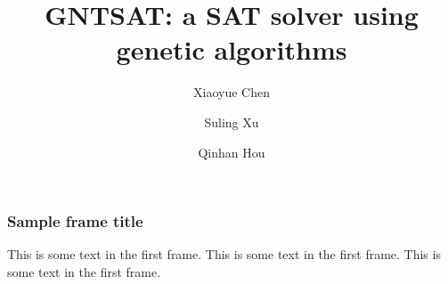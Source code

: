 \documentclass{beamer}
\title[GNTSAT]{GNTSAT: a SAT solver using genetic algorithms}
\author[Chen, Xu, Hou]{
	Xiaoyue Chen \and Suling Xu \and Qinhan Hou
}
\institute[UU]{Uppsala University}
\begin{document}
\frame{\titlepage}


\begin{frame}
	\frametitle{Sample frame title}
	This is some text in the first frame. This is some text in the first frame.
	This is some text in the first frame.
\end{frame}
\end{document}
